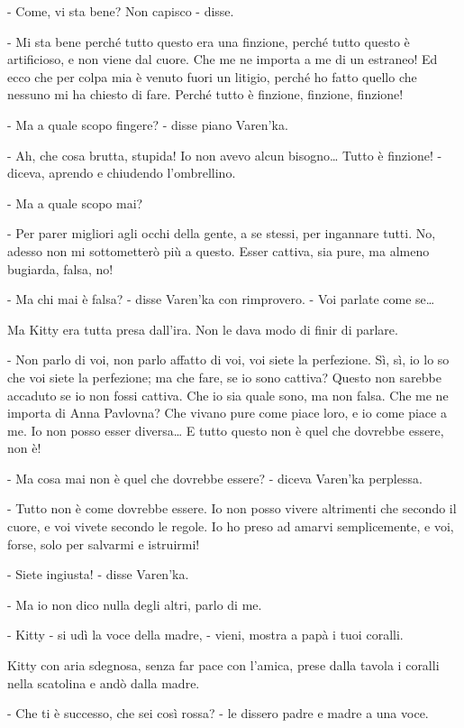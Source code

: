 - Come, vi sta bene? Non capisco - disse. 

- Mi sta bene perché tutto questo era una finzione, perché tutto questo è artificioso, e non viene dal cuore. Che me ne importa a me di un estraneo! Ed ecco che per colpa mia è venuto fuori un litigio, perché ho fatto quello che nessuno mi ha chiesto di fare. Perché tutto è finzione, finzione, finzione! 

- Ma a quale scopo fingere? - disse piano Varen'ka. 

- Ah, che cosa brutta, stupida! Io non avevo alcun bisogno\ldots{} Tutto è finzione! - diceva, aprendo e chiudendo l'ombrellino. 

- Ma a quale scopo mai? 

- Per parer migliori agli occhi della gente, a se stessi, per ingannare tutti. No, adesso non mi sottometterò più a questo. Esser cattiva, sia pure, ma almeno bugiarda, falsa, no! 

- Ma chi mai è falsa? - disse Varen'ka con rimprovero. - Voi parlate come se\ldots{} 

Ma Kitty era tutta presa dall'ira. Non le dava modo di finir di parlare. 

- Non parlo di voi, non parlo affatto di voi, voi siete la perfezione. Sì, sì, io lo so che voi siete la perfezione; ma che fare, se io sono cattiva? Questo non sarebbe accaduto se io non fossi cattiva. Che io sia quale sono, ma non falsa. Che me ne importa di Anna Pavlovna? Che vivano pure come piace loro, e io come piace a me. Io non posso esser diversa\ldots{} E tutto questo non è quel che dovrebbe essere, non è! 

- Ma cosa mai non è quel che dovrebbe essere? - diceva Varen'ka perplessa. 

- Tutto non è come dovrebbe essere. Io non posso vivere altrimenti che secondo il cuore, e voi vivete secondo le regole. Io ho preso ad amarvi semplicemente, e voi, forse, solo per salvarmi e istruirmi! 

- Siete ingiusta! - disse Varen'ka. 

- Ma io non dico nulla degli altri, parlo di me. 

- Kitty - si udì la voce della madre, - vieni, mostra a papà i tuoi coralli. 

Kitty con aria sdegnosa, senza far pace con l'amica, prese dalla tavola i coralli nella scatolina e andò dalla madre. 

- Che ti è successo, che sei così rossa? - le dissero padre e madre a una voce. 

